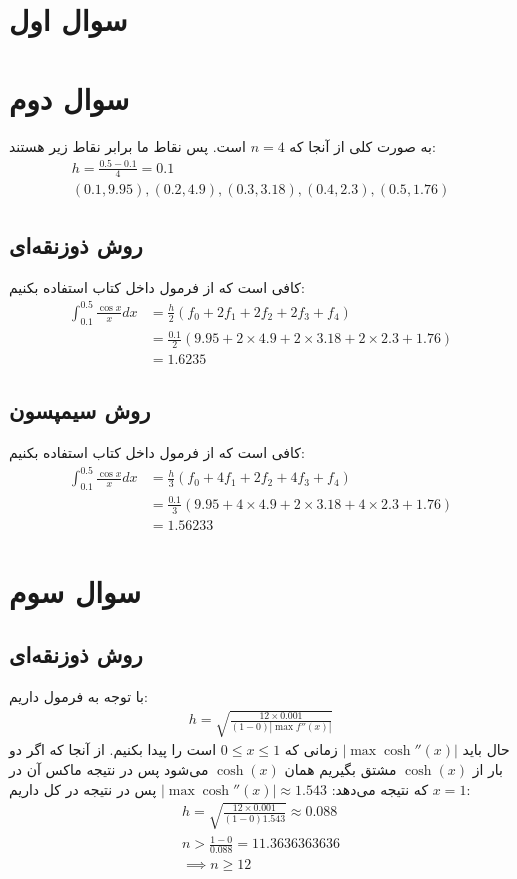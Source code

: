 \documentclass[]{article}
\begin{document}
\printheader

\section*{سوال اول}

\section*{سوال دوم}
به صورت کلی از آنجا که
$n = 4$
است. پس نقاط ما برابر نقاط زیر هستند:
\begin{gather*}
    h = \frac{0.5 - 0.1}{4} = 0.1\\
    (0.1, 9.95), (0.2, 4.9), (0.3, 3.18), (0.4, 2.3), (0.5, 1.76)
\end{gather*}
\subsection*{روش ذوزنقه‌ای}
کافی است که از فرمول داخل کتاب استفاده بکنیم:
\begin{align*}
    \int_{0.1}^{0.5} \frac{\cos x}{x} dx &= \frac{h}{2} (f_0 + 2f_1 + 2f_2 + 2f_3 + f_4)\\
    &= \frac{0.1}{2} (9.95 + 2 \times 4.9 + 2 \times 3.18 + 2 \times 2.3 + 1.76)\\
    &= \boxed{1.6235}
\end{align*}
\subsection*{روش سیمپسون}
کافی است که از فرمول داخل کتاب استفاده بکنیم:
\begin{align*}
    \int_{0.1}^{0.5} \frac{\cos x}{x} dx &= \frac{h}{3} (f_0 + 4f_1 + 2f_2 + 4f_3 + f_4)\\
    &= \frac{0.1}{3} (9.95 + 4 \times 4.9 + 2 \times 3.18 + 4 \times 2.3 + 1.76)\\
    &= \boxed{1.56233}
\end{align*}
\section*{سوال سوم}
\subsection*{روش ذوزنقه‌ای}
با توجه به فرمول داریم:
\begin{gather*}
    h = \sqrt{\frac{12 \times 0.001}{(1 - 0) |\max f''(x)|}}
\end{gather*}
حال باید
$|\max \operatorname{cosh}''(x)|$
زمانی که
$0 \le x \le 1$
است را پیدا بکنیم. از آنجا که اگر دو بار از
$\operatorname{cosh}(x)$
مشتق بگیریم همان
$\operatorname{cosh}(x)$
می‌شود پس در نتیجه ماکس آن در
$x = 1$
که نتیجه می‌دهد:
$|\max \operatorname{cosh}''(x)| \approx 1.543$
پس در نتیجه در کل داریم:
\begin{gather*}
    h = \sqrt{\frac{12 \times 0.001}{(1 - 0) 1.543}} \approx 0.088\\
    n > \frac{1 - 0}{0.088} = 11.3636363636\\
    \implies \boxed{n \ge 12}
\end{gather*}
\end{document}
